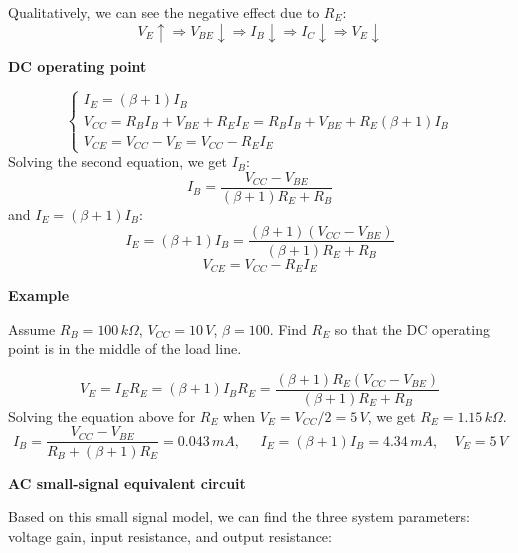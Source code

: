 Qualitatively, we can see the negative effect due to $R_E$:
\[
V_E\uparrow \Longrightarrow V_{BE} \downarrow \Longrightarrow I_B \downarrow
\Longrightarrow I_C \downarrow \Longrightarrow V_E\downarrow
\]

{\bf DC operating point}

\[ 
\left\{ \begin{array}{l} 
  I_E=(\beta+1) I_B	\\
  V_{CC}=R_B I_B+V_{BE}+R_E I_E=R_B I_B+V_{BE}+R_E (\beta+1)I_B	\\
  V_{CE}=V_{CC}-V_E=V_{CC}-R_E I_E \end{array} \right. 
\]
Solving the second equation, we get $I_B$:
\[
I_B=\frac{V_{CC}-V_{BE}}{(\beta+1)R_E+R_B} 
\]
and $I_E=(\beta+1)I_B$:
\[
I_E=(\beta+1) I_B=\frac{(\beta+1)(V_{CC}-V_{BE})}{(\beta+1)R_E+R_B} 
\]
\[
V_{CE}=V_{CC}-R_EI_E 
\]

{\bf Example}

Assume $R_B=100\,k\Omega$, $V_{CC}=10\,V$, $\beta=100$. Find $R_E$ so that the 
DC operating point is in the middle of the load line.

\[ 
V_E=I_E R_E=(\beta+1)I_B R_E=\frac{(\beta+1) R_E (V_{CC}-V_{BE})}{(\beta+1)R_E+R_B} 
\]
Solving the equation above for $R_E$ when $V_E=V_{CC}/2=5\,V$, we get 
$R_E=1.15\,k\Omega$.
\[
I_B=\frac{V_{CC}-V_{BE}}{R_B+(\beta+1)R_E}=0.043\,mA,
\;\;\;\;\;I_E=(\beta+1)I_B=4.34\,mA,\;\;\;\;V_E=5\,V
\]


{\bf AC small-signal equivalent circuit}


Based on this small signal model, we can find the three system parameters:
voltage gain, input resistance, and output resistance:

